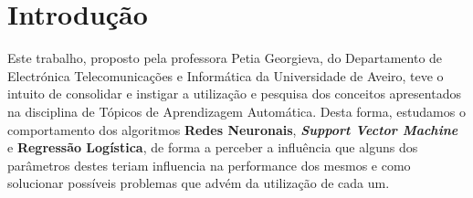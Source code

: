 \section{Introdução}
Este trabalho, proposto pela professora Petia Georgieva, do Departamento de Electrónica Telecomunicações e Informática da Universidade de Aveiro, teve o intuito de consolidar e instigar a utilização e pesquisa dos conceitos apresentados na disciplina de Tópicos de Aprendizagem Automática.
Desta forma, estudamos o comportamento dos algoritmos \textbf{Redes Neuronais}, \textbf{\textit{Support Vector Machine}} e \textbf{Regressão Logística}, de forma a perceber a influência que alguns dos parâmetros destes teriam influencia na performance dos mesmos e como solucionar possíveis problemas que advém da utilização de cada um.
